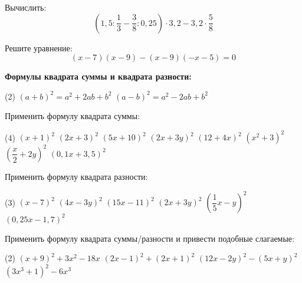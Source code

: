 \begin{class}[number=3]
	\begin{listofex}
		\item Вычислить: \[ \left(  1,5 : \dfrac{1}{3} - \dfrac{3}{8} : 0,25 \right) \cdot 3,2 - 3,2 \cdot \dfrac{5}{8} \]
		\item Решите уравнение: \[ (x-7)(x-9)-(x-9)(-x-5)=0 \]
	\end{listofex}
	\textbf{Формулы квадрата суммы и квадрата разности:}\\
	\begin{tasks}(2)
		\task \( (a+b)^2=a^2+2ab+b^2 \)
		\task \( (a-b)^2=a^2-2ab+b^2 \)
	\end{tasks}
	\begin{listofex}[resume]
		\item Применить формулу квадрата суммы:
		\begin{tasks}(4)
			\task \( (x+1)^2 \)
			\task \( (2x+3)^2 \)
			\task \( (5x+10)^2 \)
			\task \( (2x+3y)^2 \)
			\task \( (12+4x)^2 \)
			\task \( (x^2+3)^2 \)
			\task \( \left( \dfrac{x}{2}+2y \right)^2 \)
			\task \( (0,1x+3,5)^2 \)
		\end{tasks}
		\item Применить формулу квадрата разности:
		\begin{tasks}(3)
			\task \( (x-7)^2 \)
			\task \( (4x-3y)^2 \)
			\task \( (15x-11)^2 \)
			\task \( (2x+3y)^2 \)
			\task \( \left( \dfrac{1}{5}x-y \right)^2 \)
			\task \( (0,25x-1,7)^2 \)
		\end{tasks}
		\item Применить формулу квадрата суммы/разности и привести подобные слагаемые:
		\begin{tasks}(2)
			\task \( (x+9)^2+3x^2-18x \)
			\task \( (2x-1)^2+(2x+1)^2 \)
			\task \( (12x-2y)^2-(5x+y)^2 \)
			\task \( (3x^3+1)^2-6x^3 \)
		\end{tasks}
	\end{listofex}
\end{class}

